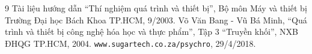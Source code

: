 \renewcommand{\refname}{REFERENCES}
\begin{thebibliography}{9}
     Tài liệu hướng dẫn ``Thí nghiệm quá trình và thiết bị'', Bộ môn Máy và thiết bị Trường Đại học Bách Khoa TP.HCM, 9/2003.
     Võ Văn Bang - Vũ Bá Minh, ``Quá trình và thiết bị công nghệ hóa học và thực phẩm'', Tập 3 ``Truyền khối'', NXB ĐHQG TP.HCM, 2004.
     \texttt{www.sugartech.co.za/psychro}, 29/4/2018.
\end{thebibliography}
